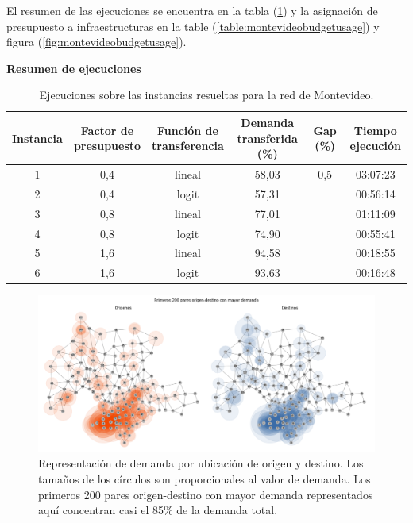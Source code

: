 \documentclass{article}
\begin{document}
  El resumen de las ejecuciones se encuentra en la tabla (\ref{table:montevideoexecutions}) y la asignación de presupuesto a infraestructuras en la table (\ref{table:montevideobudgetusage}) y figura (\ref{fig:montevideobudgetusage}).

  \begin{table}[h!]
    \centering
    \caption*{{\bf Resumen de ejecuciones}}
    \begin{tabular}{cccccc}
      \toprule
        Instancia & \shortstack{Factor de \\ presupuesto} & \shortstack{Función de \\ transferencia} & \shortstack{Demanda \\ transferida (\%)} & Gap (\%) & \shortstack{Tiempo \\ ejecución} \\
      \midrule
        1 & 0,4 & lineal & 58,03 & 0,5 & 03:07:23 \\
        2 & 0,4 & logit & 57,31 &  & 00:56:14 \\
        3 & 0,8 & lineal & 77,01 &  & 01:11:09 \\
        4 & 0,8 & logit & 74,90 &  & 00:55:41 \\
        5 & 1,6 & lineal & 94,58 &  & 00:18:55 \\
        6 & 1,6 & logit & 93,63 &  & 00:16:48 \\
      \bottomrule
    \end{tabular}
      \caption{Ejecuciones sobre las instancias resueltas para la red de Montevideo.}\label{table:montevideoexecutions}
  \end{table}

  \begin{figure}[h!]
    \centering
    \includegraphics[width=12cm]{../resources/montevideo_demands.png}
      \caption{Representación de demanda por ubicación de origen y destino. Los tamaños de los círculos son proporcionales al valor de demanda. Los primeros 200 pares origen-destino con mayor demanda representados aquí concentran casi el 85\% de la demanda total.}
    \label{fig:montevideodemanddist}
  \end{figure}
\end{document}
